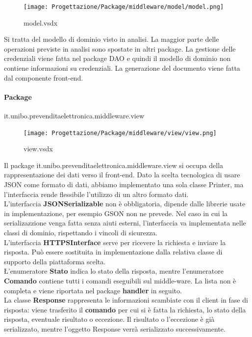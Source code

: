 \documentclass[a4paper]{article}
\begin{document}

\begin{figure}[H]
    \texttt{[image: Progettazione/Package/middleware/model/model.png]}
    \centering
    \caption{model.vsdx}
\end{figure}

Si tratta del modello di dominio visto in analisi. La maggior parte delle operazioni previste in analisi sono spostate in altri package. La gestione delle credenziali viene fatta nel package DAO e quindi il modello di dominio non contiene informazioni su credenziali. La generazione del documento viene fatta dal componente front-end.

\newpage

\paragraph{Package} it.unibo.prevenditaelettronica.middleware.view



\begin{figure}[H]
    \texttt{[image: Progettazione/Package/middleware/view/view.png]}
    \centering
    \caption{view.vsdx}
\end{figure}

Il package it.unibo.prevenditaelettronica.middleware.view si occupa della rappresentazione dei dati verso il front-end. Dato la scelta tecnologica di usare JSON come formato di dati, abbiamo implementato una sola classe Printer, ma l'interfaccia rende flessibile l'utilizzo di un altro formato dati.\\L'interfaccia \textbf{JSONSerializable} non è obbligatoria, dipende dalle librerie usate in implementazione, per esempio GSON non ne prevede. Nel caso in cui la serializazzione venga fatta senza aiuti esterni, l'interfaccia va implementata nelle classi di dominio, rispettando i vincoli di sicurezza.\\L'interfaccia \textbf{HTTPSInterface} serve per ricevere la richiesta e inviare la risposta. Può essere sostituita in implementazione dalla relativa classe di supporto della piattaforma scelta.\\\L'enumeratore \textbf{Stato} indica lo stato della risposta, mentre l'enumeratore \textbf{Comando} contiene tutti i comandi eseguibili sul middle-ware. La lista non è completa e viene riportata nel package \textbf{handler} in seguito.\\La classe \textbf{Response} rappresenta le informazioni scambiate con il client in fase di risposta: viene trasferito il \textbf{comando} per cui si è fatta la richiesta, lo stato della risposta, eventuale risultato o eccezione. Il risultato o l'eccezione è già serializzato, mentre l'oggetto Response verrà serializzato successivamente.
\end{document}
